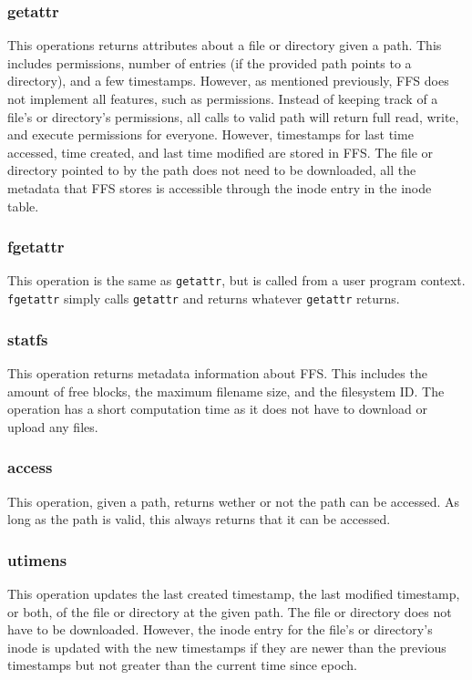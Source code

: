 \subsubsection{getattr}
This operations returns attributes about a file or directory given a path. This includes permissions, number of entries (if the provided path points to a directory), and a few timestamps. However, as mentioned previously, FFS does not implement all features, such as permissions. Instead of keeping track of a file's or directory's permissions, all calls to valid path will return full read, write, and execute permissions for everyone. However, timestamps for last time accessed, time created, and last time modified are stored in FFS. The file or directory pointed to by the path does not need to be downloaded, all the metadata that FFS stores is accessible through the inode entry in the inode table.

\subsubsection{fgetattr}
This operation is the same as \texttt{getattr}, but is called from a user program context. \texttt{fgetattr} simply calls \texttt{getattr} and returns whatever \texttt{getattr} returns.

\subsubsection{statfs}
This operation returns metadata information about FFS. This includes the amount of free blocks, the maximum filename size, and the filesystem ID. The operation has a short computation time as it does not have to download or upload any files.

\subsubsection{access}
This operation, given a path, returns wether or not the path can be accessed. As long as the path is valid, this always returns that it can be accessed.

\subsubsection{utimens}
This operation updates the last created timestamp, the last modified timestamp, or both, of the file or directory at the given path. The file or directory does not have to be downloaded. However, the inode entry for the file's or directory's inode is updated with the new timestamps if they are newer than the previous timestamps but not greater than the current time since epoch.

